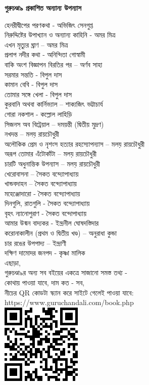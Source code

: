 \clearpage
\small
\centering
\textbf{গুরুচণ্ডা৯ প্রকাশিত অন্যান্য উপন্যাস} \\
\raggedright
\scriptsize
হেনরীদ্বীপের পরণকথা - অভিজিৎ সেনগুপ্ত \\
নিরুদ্দিষ্টের উপাখ্যান ও অন্যান্য কাহিনি - অমর মিত্র \\
এখন মৃত্যুর ঘ্রাণ -- অমর মিত্র \\
প্রলাপ নদীর কথা - অনিন্দিতা গোস্বামী \\
বাকি অংশ বিজ্ঞাপন বিরতির পর -- অর্ণব সাহা \\
সরমার সন্ততি - বিপুল দাস \\
কামান বেবি - বিপুল দাস \\
তোমার সঙ্গে খেলা - বিপুল দাস \\
কুরবানি অথবা কার্নিভ্যাল – শাক্যজিৎ ভট্টাচার্য \\
গোরা নকশাল - কল্লোল লাহিড়ি \\
সিজনস অব বিট্রেয়াল – দময়ন্তী (দ্বিতীয় মুদ্রণ) \\
নখদন্ত -- মলয় রায়চৌধুরী \\
অলৌকিক প্রেম ও নৃশংস হত্যার রহস্যোপন্যাস – মলয় রায়চৌধুরী  \\
অরূপ তোমার এঁটোকাঁটা -- মলয় রায়চৌধুরী \\
চারটি অধুনান্তিক উপন্যাস – মলয় রায়চৌধুরী \\
খেরোবাসনা -- সৈকত বন্দ্যোপাধ্যায়  \\
খান্ডবদাহন -- সৈকত বন্দ্যোপাধ্যায় \\
মহেঞ্জোদারো - সৈকত বন্দ্যোপাধ্যায় \\
দিনগুলি, রাতগুলি - সৈকত বন্দ্যোপাধ্যায় \\
বৃহৎ ন্যানোপুরাণ - সৈকত বন্দোপাধ্যায় \\
আমার উন্মন বাদ্যকর - ইন্দ্রনীল ঘোষদস্তিদার \\
করোনাকালীন (প্রথম ও দ্বিতীয় খণ্ড) – অনুরাধা কুন্ডা \\
চার রঙের উপপাদ্য – ইন্দ্রাণী \\
দক্ষিণ দামোদর জনপদ - কৃষ্ণা মালিক \\
\baselineskip
\raggedleft
\scriptsize
এছাড়া, \\
গুরুচণ্ডা৯র অন্য সব বইয়ের একত্রে সাজানো সমস্ত তথ্য - \\
কোথায় পাওয়া যাবে, দাম কত - সব, \\
নীচের QR কোডটা স্ক্যান করে সাইটে গেলেই পাওয়া যাবে: \\
https://www.guruchandali.com/book.php \\
\baselineskip
\includegraphics[scale=0.8]{Images/QRCode_2022.png}